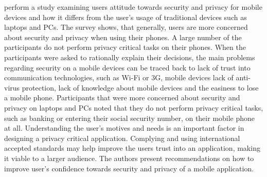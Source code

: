 \cite{chin2012measuring} perform a study examining users attitude towards security and privacy for mobile devices and how it differs from the user’s usage of traditional devices such as laptops and PCs. The survey shows, that generally, users are more concerned about security and privacy when using their phones. A large number of the participants do not perform privacy critical tasks on their phones. When the participants were asked to rationally explain their decisions, the main problems regarding security on a mobile devices can be traced back to lack of trust into communication technologies, such as Wi-Fi or 3G, mobile devices lack of anti-virus protection, lack of knowledge about mobile devices and the easiness to lose a mobile phone. Participants that were more concerned about security and privacy on laptops and PCs noted that they do not perform privacy critical tasks, such as banking or entering their social security number, on their mobile phone at all. Understanding the user’s motives and needs is an important factor in designing a privacy critical application. Complying and using international accepted standards may help improve the users trust into an application, making it viable to a larger audience. The authors present recommendations on how to improve user’s confidence towards security and privacy of a mobile application.



